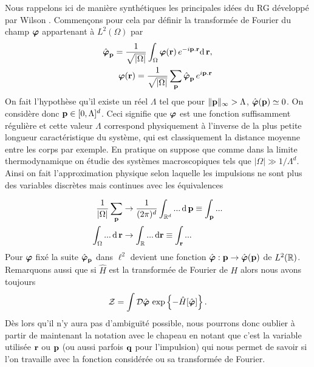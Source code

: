 \documentclass[10pt]{article}
\begin{document}
\begin{multicols}{2}
Nous rappelons ici de manière synthétiques les principales idées du RG développé par Wilson \cite{wilson1971renormalization, wilson1971renormalization2,fisher1998renormalization}. Commençons pour cela par définir la transformée de Fourier du champ $\boldsymbol{ \varphi}$ appartenant à $L^2(\Omega)$ par 
\begin{equation}
\begin{split}
\hat{\boldsymbol{ \varphi}}_{\bf p} = \frac{1}{\sqrt{|\Omega|}}\int_\Omega \boldsymbol{ \varphi}({\bf r}) \, e^{-i {\bf p} . {\bf r}} \text{d} \, {\bf r}, \\
\boldsymbol{ \varphi}({\bf r}) = \frac{1}{\sqrt{|\Omega|}}\sum_{\bf p} \hat{\boldsymbol{ \varphi}}_{\bf p} \, e^{i {\bf p}  .{\bf r}}
\end{split} 	
\end{equation}
On fait l'hypothèse qu'il existe un réel $\Lambda$ tel que pour $\|{\bf p}\|_{\infty} > \Lambda$, $\hat{\boldsymbol{ \varphi}}({\bf p}) \simeq 0$. On considère donc ${\bf p} \in [0, \Lambda]^d$. Ceci signifie que $\boldsymbol{ \varphi}$ est une fonction suffisamment régulière et cette valeur $\Lambda$ correspond physiquement à l'inverse de la plus petite longueur caractéristique du système, qui est classiquement la distance moyenne entre les corps par exemple. En pratique on suppose que comme dans la limite thermodynamique on étudie des systèmes macroscopiques tels que $|\Omega|\gg 1/\Lambda^d$. Ainsi on fait l'approximation physique selon laquelle les impulsions ne sont plus des variables discrètes mais continues avec les équivalences  

\begin{equation}
\begin{split}
	\frac{1}{|\Omega|} \sum_{{\bf p}} & \rightarrow \frac{1}{(2\pi)^d} \int_{\mathbb{R}^d} ... \, \text{d} \, {\bf p}  \equiv \int_{\bf p} ... \\
	\int_\Omega	... \, \text{d} \, {\bf r} & \rightarrow \int_{\mathbb{R}} ... \, \text{d} {\bf r} \equiv \int_{\bf r} ...
\end{split}
\end{equation}
Pour $\boldsymbol{ \varphi}$ fixé la suite $\hat{\boldsymbol{ \varphi}}_{\bf p}$ dans $\ell^2$ devient une fonction $\hat{\boldsymbol{ \varphi}} : {\bf p} \rightarrow \hat{\boldsymbol{ \varphi}}({\bf p})$ de $L^2(\mathbb{R})$. 
Remarquons aussi que si $\hat{H}$ est la transformée de Fourier de $H$ alors nous avons toujours
\begin{equation}
\mathcal{Z} = \int \mathcal{D} \hat{\boldsymbol{ \varphi}} \, \exp\left\{- \hat{H}[\hat{\boldsymbol{ \varphi}}]\right\}. 
\end{equation} 
Dès lors qu'il n'y aura pas d'ambiguïté possible, nous pourrons donc oublier à partir de maintenant la notation avec le chapeau en notant que c'est la variable utilisée ${\bf r}$ ou ${\bf p}$ (ou aussi parfois ${\bf q}$ pour l'impulsion) qui nous permet de savoir si l'on travaille avec la fonction considérée ou sa transformée de Fourier. \\



\end{multicols}
\end{document}
